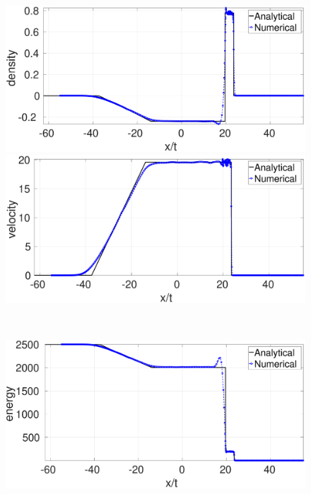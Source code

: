 \documentclass[review]{elsarticle}
\begin{document}
\begin{figure}[H]
    \centering
    \begin{minipage}{.495\textwidth}
        \centering
        \includegraphics[width=0.99 \textwidth]{./Figures/strong-blast/StrBlst-RCM-rho-Rp3}
    \end{minipage}%
    \begin{minipage}{.495 \textwidth}
        \centering
        \includegraphics[width=0.99 \textwidth]{./Figures/strong-blast/StrBlst-RCM-v-Rp3}
    \end{minipage}%
    \\
    \begin{minipage}{.495 \textwidth}
        \centering
        \includegraphics[width=0.99 \textwidth]{./Figures/strong-blast/StrBlst-RCM-e-Rp3}

\end{minipage}
\end{figure}
\end{document}
